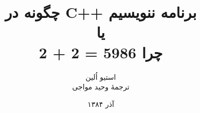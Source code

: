 \documentclass[10pt, a4paper]{book}
\begin{document}
    \title{چگونه در C++ برنامه ننویسیم\\
    یا\\
    چرا 5986 = 2 + 2}
    \author{استیو اُلین\\
    ترجمهٔ وحید مواجی\\
    }
    \date{آذر ۱۳۸۴}
    \frontmatter                            %
    \maketitle                              %
    \tableofcontents                        %
    \mainmatter

    

    

    
\end{document}
